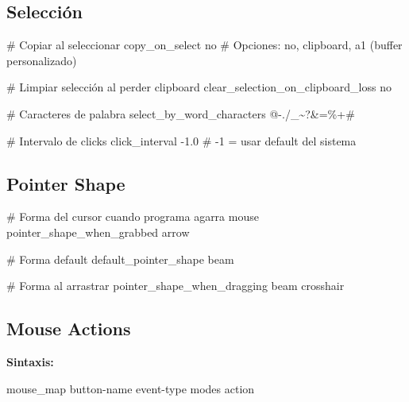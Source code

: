\documentclass[
  doc,
  floatsintext,
  longtable,
  a4paper,
  nolmodern,
  notxfonts,
  notimes,
  12pt,
  colorlinks=true,linkcolor=blue,citecolor=blue,urlcolor=blue]{apa7}
\newenvironment{Shaded}{\begin{snugshade}}{\end{snugshade}}
\newcommand{\CommentTok}[1]{\textcolor[rgb]{0.37,0.37,0.37}{#1}}
\newcommand{\DataTypeTok}[1]{\textcolor[rgb]{0.68,0.00,0.00}{#1}}
\newcommand{\ErrorTok}[1]{\textcolor[rgb]{0.68,0.00,0.00}{#1}}
\newcommand{\OperatorTok}[1]{\textcolor[rgb]{0.37,0.37,0.37}{#1}}
\begin{document}
\subsection{Selección}\label{selecciuxf3n}

\begin{Shaded}
\begin{Highlighting}[]
\CommentTok{\# Copiar al seleccionar}
\DataTypeTok{copy\_on\_select} \DataTypeTok{no}
\CommentTok{\# Opciones: no, clipboard, a1 (buffer personalizado)}

\CommentTok{\# Limpiar selección al perder clipboard}
\DataTypeTok{clear\_selection\_on\_clipboard\_loss} \DataTypeTok{no}

\CommentTok{\# Caracteres de palabra}
\DataTypeTok{select\_by\_word\_characters} \ErrorTok{@}\DataTypeTok{{-}.}\ErrorTok{/}\DataTypeTok{\_}\ErrorTok{\textasciitilde{}?\&}\OperatorTok{=}\ErrorTok{\%+}\CommentTok{\#}

\CommentTok{\# Intervalo de clicks}
\DataTypeTok{click\_interval} \DataTypeTok{{-}1.0}
\CommentTok{\# {-}1 = usar default del sistema}
\end{Highlighting}
\end{Shaded}

\subsection{Pointer Shape}\label{pointer-shape}

\begin{Shaded}
\begin{Highlighting}[]
\CommentTok{\# Forma del cursor cuando programa agarra mouse}
\DataTypeTok{pointer\_shape\_when\_grabbed} \DataTypeTok{arrow}

\CommentTok{\# Forma default}
\DataTypeTok{default\_pointer\_shape} \DataTypeTok{beam}

\CommentTok{\# Forma al arrastrar}
\DataTypeTok{pointer\_shape\_when\_dragging} \DataTypeTok{beam} \DataTypeTok{crosshair}
\end{Highlighting}
\end{Shaded}

\subsection{Mouse Actions}\label{mouse-actions}

\textbf{Sintaxis:}

\begin{Shaded}
\begin{Highlighting}[]
\DataTypeTok{mouse\_map} \DataTypeTok{button{-}name} \DataTypeTok{event{-}type} \DataTypeTok{modes} \DataTypeTok{action}
\end{Highlighting}
\end{Shaded}
\end{document}
